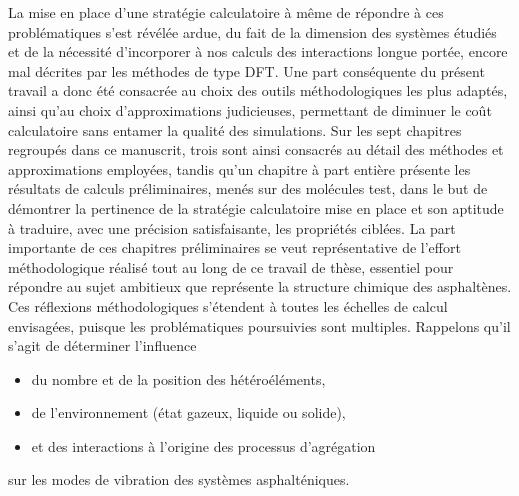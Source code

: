 	La mise en place d'une stratégie calculatoire à même de répondre à ces problématiques s'est révélée ardue, du fait de la dimension des systèmes étudiés et de la nécessité d'incorporer à nos calculs des interactions longue portée, encore mal décrites par les méthodes de type DFT. Une part conséquente du présent travail a donc été consacrée au choix des outils méthodologiques les plus adaptés, ainsi qu'au choix d'approximations judicieuses, permettant de diminuer le coût calculatoire sans entamer la qualité des simulations. 
	Sur les sept chapitres regroupés dans ce manuscrit, trois sont ainsi consacrés au détail des méthodes et approximations employées, tandis qu'un chapitre à part entière présente les résultats de calculs préliminaires, menés sur des molécules test, dans le but de démontrer la pertinence de la stratégie calculatoire mise en place et son aptitude à traduire, avec une précision satisfaisante, les propriétés ciblées. 
	La part importante de ces chapitres préliminaires se veut représentative de l'effort méthodologique réalisé tout au long de ce travail de thèse, essentiel pour répondre au sujet ambitieux que représente la structure chimique des asphaltènes. Ces réflexions méthodologiques s'étendent à toutes les échelles de calcul envisagées, puisque les problématiques poursuivies sont multiples. Rappelons qu'il s'agit de déterminer l'influence 
	\begin{itemize}
	\item du nombre et de la position des hétéroéléments,
	\item de l'environnement (état gazeux, liquide ou solide),
	\item et des interactions à l'origine des processus d'agrégation
	\end{itemize}
sur les modes de vibration des systèmes asphalténiques.\\
 
